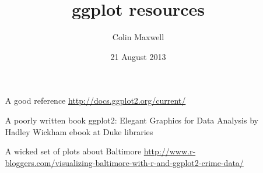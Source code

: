 \documentclass[11pt]{article}
\title{ggplot resources}
\author{Colin Maxwell}
\date{21 August 2013}
\begin{document}
\maketitle

\setcounter{tocdepth}{3}
\tableofcontents
\vspace*{1cm}
\begin{itemize}
\item[A good reference]\href{http://docs.ggplot2.org/current/}{http://docs.ggplot2.org/current/}
\item[A poorly written book]ggplot2: Elegant Graphics for Data Analysis by Hadley Wickham ebook at Duke libraries
\item[A wicked set of plots about Baltimore]\href{http://www.r-bloggers.com/visualizing-baltimore-with-r-and-ggplot2-crime-data/}{http://www.r-bloggers.com/visualizing-baltimore-with-r-and-ggplot2-crime-data/}
\end{itemize}
\end{document}
